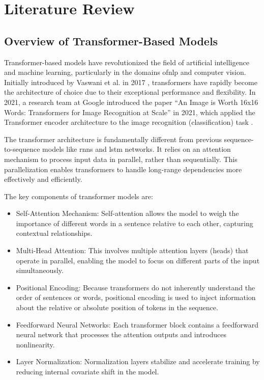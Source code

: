 \chapter{Literature Review}

\section{Overview of Transformer-Based Models}
Transformer-based models have revolutionized the field of artificial intelligence and machine learning, particularly in the domains of\gls{nlp} and computer vision. Initially introduced by Vaswani et al. in 2017 \cite{vaswani2023attentionneed}, transformers have rapidly become the architecture of choice due to their exceptional performance and flexibility.  In 2021, a research team at Google introduced the paper \enquote{An Image is Worth 16x16 Words: Transformers for Image Recognition at Scale} in 2021, which applied the Transformer encoder architecture to the image recognition (classification) task \cite{dosovitskiy2021imageworth16x16words}.

The transformer architecture is fundamentally different from previous sequence-to-sequence models like \glspl{rnn} and \gls{lstm} networks. It relies on an attention mechanism to process input data in parallel, rather than sequentially. This parallelization enables transformers to handle long-range dependencies more effectively and efficiently.

The key components of transformer models are:
\begin{itemize}
	\item Self-Attention Mechanism: Self-attention allows the model to weigh the importance of different words in a sentence relative to each other, capturing contextual relationships.
	\item Multi-Head Attention: This involves multiple attention layers (heads) that operate in parallel, enabling the model to focus on different parts of the input simultaneously.
	\item Positional Encoding: Because transformers do not inherently understand the order of sentences or words, positional encoding is used to inject information about the relative or absolute position of tokens in the sequence.
	\item Feedforward Neural Networks: Each transformer block contains a feedforward neural network that processes the attention outputs and introduces nonlinearity.
	\item Layer Normalization: Normalization layers stabilize and accelerate training by reducing internal covariate shift in the model.
\end{itemize}

